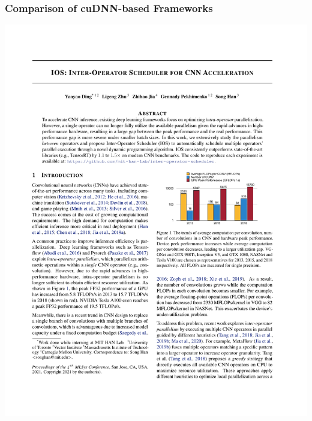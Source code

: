 \documentclass[12pt,aspectratio=169]{beamer}
\begin{document}
    \begin{frame}
        \frametitle{Comparison of cuDNN-based Frameworks}

        \begin{center}
            \includegraphics[page=8,trim=10.6cm 22.2cm 2.2cm 2.2cm,clip,scale=1.2]{paper.pdf}
        \end{center}
    \end{frame}
\end{document}
